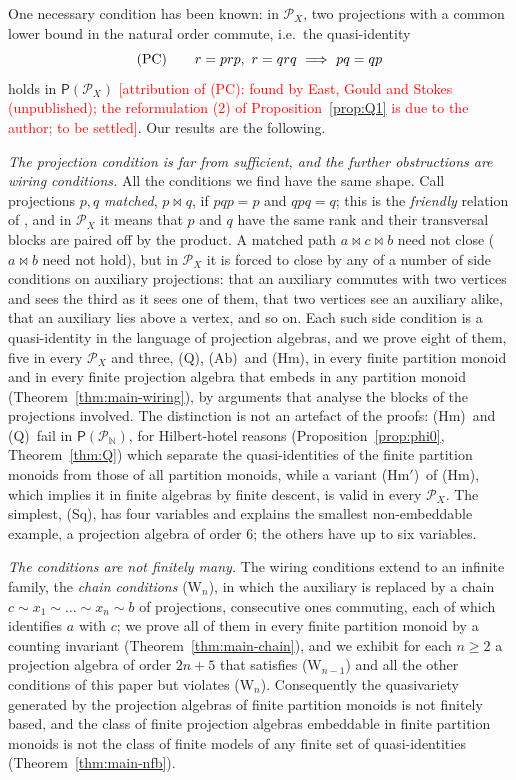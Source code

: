 \documentclass[11pt]{amsart}
\theoremstyle{definition}
\renewcommand{\P}{\mathcal{P}}      %
\newcommand{\PA}{\mathsf{P}}         %
\newcommand{\mt}{\bowtie}      %
\newcommand{\todo}[1]{\textcolor{red}{[#1]}}
\newcommand{\Qone}{\textup{(PC)}}     %
\newcommand{\Wire}{\textup{(Sq)}}      %
\newcommand{\Qcond}{\textup{(Q)}}
\newcommand{\Kzero}{\textup{(Hm)}}     %
\newcommand{\Hmp}{\textup{(Hm$'$)}}     %
\newcommand{\Kfour}{\textup{(Ab)}}     %
\newcommand{\Wn}[1][n]{\textup{(W$_{#1}$)}}
\begin{document}
One necessary condition has been known: in $\P_X$, two projections with a common lower bound in the natural order commute, i.e.\ the quasi-identity
\[
\Qone\qquad r=prp,\ r=qrq\ \Longrightarrow\ pq=qp
\]
holds in $\PA(\P_X)$ \todo{attribution of \Qone: found by East, Gould and Stokes (unpublished); the reformulation (2) of Proposition~\ref{prop:Q1} is due to the author; to be settled}. Our results are the following.

\emph{The projection condition is far from sufficient, and the further obstructions are wiring conditions.} All the conditions we find have the same shape. Call projections $p,q$ \emph{matched}, $p\mt q$, if $pqp=p$ and $qpq=q$; this is the \emph{friendly} relation of \cite{EGMR}, and in $\P_X$ it means that $p$ and $q$ have the same rank and their transversal blocks are paired off by the product. A matched path $a\mt c\mt b$ need not close ($a\mt b$ need not hold), but in $\P_X$ it is forced to close by any of a number of side conditions on auxiliary projections: that an auxiliary commutes with two vertices and sees the third as it sees one of them, that two vertices see an auxiliary alike, that an auxiliary lies above a vertex, and so on. Each such side condition is a quasi-identity in the language of projection algebras, and we prove eight of them, five in every $\P_X$ and three, \Qcond, \Kfour\ and \Kzero, in every finite partition monoid and in every finite projection algebra that embeds in any partition monoid (Theorem~\ref{thm:main-wiring}), by arguments that analyse the blocks of the projections involved. The distinction is not an artefact of the proofs: \Kzero\ and \Qcond\ fail in $\PA(\P_{\mathbb N})$, for Hilbert-hotel reasons (Proposition~\ref{prop:phi0}, Theorem~\ref{thm:Q}) which separate the quasi-identities of the finite partition monoids from those of all partition monoids, while a variant \Hmp\ of \Kzero, which implies it in finite algebras by finite descent, is valid in every $\P_X$. The simplest, \Wire, has four variables and explains the smallest non-embeddable example, a projection algebra of order $6$; the others have up to six variables.

\emph{The conditions are not finitely many.} The wiring conditions extend to an infinite family, the \emph{chain conditions} \Wn, in which the auxiliary is replaced by a chain $c\sim x_1\sim\dots\sim x_n\sim b$ of projections, consecutive ones commuting, each of which identifies $a$ with $c$; we prove all of them in every finite partition monoid by a counting invariant (Theorem~\ref{thm:main-chain}), and we exhibit for each $n\ge2$ a projection algebra of order $2n+5$ that satisfies \Wn[n-1] and all the other conditions of this paper but violates \Wn. Consequently the quasivariety generated by the projection algebras of finite partition monoids is not finitely based, and the class of finite projection algebras embeddable in finite partition monoids is not the class of finite models of any finite set of quasi-identities (Theorem~\ref{thm:main-nfb}).
\end{document}
